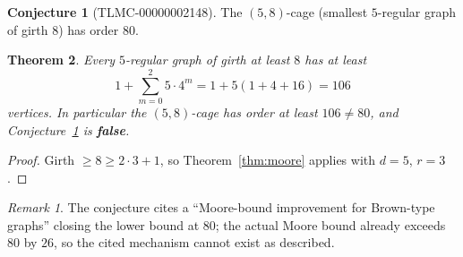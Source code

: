 \documentclass[11pt]{article}
\newtheorem{theorem}{Theorem}
\theoremstyle{definition}
\theoremstyle{remark}
\newtheorem*{remark}{Remark}
\theoremstyle{definition}
\newtheorem{conjecture}[theorem]{Conjecture}
\begin{document}
\begin{conjecture}[TLMC-00000002148]\label{conj:2148}
The $(5,8)$-cage (smallest $5$-regular graph of girth $8$) has order $80$.
\end{conjecture}

\begin{theorem}\label{thm:2148}
Every $5$-regular graph of girth at least $8$ has at least
\[
1 + \sum_{m=0}^{2} 5 \cdot 4^m = 1 + 5(1 + 4 + 16) = 106
\]
vertices. In particular the $(5,8)$-cage has order at least $106 \ne 80$, and Conjecture~\ref{conj:2148} is \textbf{false}.
\end{theorem}

\begin{proof}
Girth $\ge 8 \ge 2 \cdot 3 + 1$, so Theorem~\ref{thm:moore} applies with $d = 5$, $r = 3$.
\end{proof}

\begin{remark}
The conjecture cites a ``Moore-bound improvement for Brown-type graphs'' closing the lower bound at $80$; the actual Moore bound already exceeds $80$ by $26$, so the cited mechanism cannot exist as described.
\end{remark}
\end{document}
